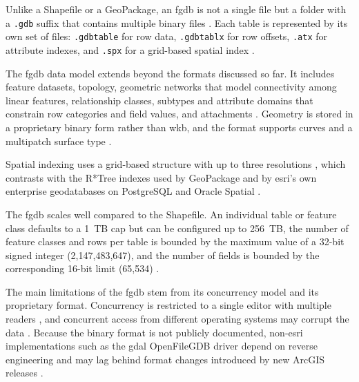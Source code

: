 Unlike a Shapefile or a GeoPackage, an \acrshort{fgdb} is not a single file but a folder with a \texttt{.gdb} suffix that contains multiple binary files \parencite{rouault2013_filegdb_format_specification, gdal2025_openfilegdb_driver}. Each table is represented by its own set of files: \texttt{.gdbtable} for row data, \texttt{.gdbtablx} for row offsets, \texttt{.atx} for attribute indexes, and \texttt{.spx} for a grid-based spatial index \parencite{rouault2013_filegdb_format_specification}.

The \acrshort{fgdb} data model extends beyond the formats discussed so far. It includes feature datasets, topology, geometric networks that model connectivity among linear features, relationship classes, subtypes and attribute domains that constrain row categories and field values, and attachments \parencite{esri2024_file_geodatabases_overview}. Geometry is stored in a proprietary binary form rather than \acrshort{wkb}, and the format supports curves and a multipatch surface type \parencite{rouault2013_filegdb_format_specification}.

Spatial indexing uses a grid-based structure with up to three resolutions \parencite{rouault2013_filegdb_format_specification, esri2024_spatial_indexes}, which contrasts with the R*Tree indexes used by GeoPackage and by \acrshort{esri}'s own enterprise geodatabases on PostgreSQL and Oracle Spatial \parencite{esri2024_spatial_indexes}.

The \acrshort{fgdb} scales well compared to the Shapefile. An individual table or feature class defaults to a 1~TB cap but can be configured up to 256~TB, the number of feature classes and rows per table is bounded by the maximum value of a 32-bit signed integer (2,147,483,647), and the number of fields is bounded by the corresponding 16-bit limit (65,534) \parencite{esri2024_file_geodatabase_size_limits}.

The main limitations of the \acrshort{fgdb} stem from its concurrency model and its proprietary format. Concurrency is restricted to a single editor with multiple readers \parencite{esri2024_types_of_geodatabases}, and concurrent access from different operating systems may corrupt the data \parencite{esri2024_file_geodatabase_api}. Because the binary format is not publicly documented, non-\acrshort{esri} implementations such as the \acrshort{gdal} OpenFileGDB driver depend on reverse engineering and may lag behind format changes introduced by new ArcGIS releases \parencite{rouault2013_filegdb_format_specification, gdal2025_openfilegdb_driver}.

